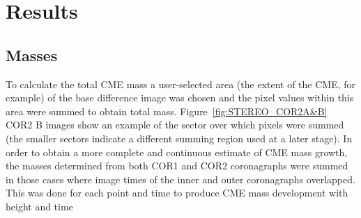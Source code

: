 

\section{Results}\label{sec:11}
\subsection{Masses}

To calculate the total CME mass a user-selected area (the extent of the CME, for example) of the base difference image was chosen and the pixel values within this area were summed to obtain total mass. Figure~\ref{fig:STEREO_COR2A&B} COR2 B images show an example of the sector over which pixels were summed (the smaller sectors indicate a different summing region used at a later stage). In order to obtain a more complete and continuous estimate of CME mass growth, the masses determined from both COR1 and COR2 coronagraphs were summed in those cases where image times of the inner and outer coronagraphs overlapped. This was done for each point and time to produce CME mass development with height and time


